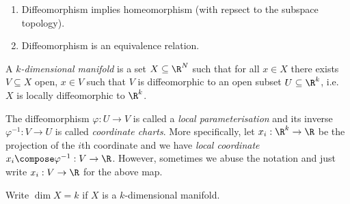 \documentclass[a4paper]{article}
\begin{document}
\begin{remark}\leavevmode
  \begin{enumerate}
  \item Diffeomorphism implies homeomorphism (with repsect to the subspace topology).
  \item Diffeomorphism is an equivalence relation.
  \end{enumerate}
\end{remark}

\begin{definition}[Manifold]
  A \emph{\(k\)-dimensional manifold} is a set \(X \subseteq \R^N\) such that for all \(x \in X\) there exists \(V \subseteq X\) open, \(x \in V\) such that \(V\) is diffeomorphic to an open subset \(U \subseteq \R^k\), i.e.\ \(X\) is locally diffeomorphic to \(\R^k\).
\end{definition}

\begin{remark}
  The diffeomorphism \(\varphi: U \to V\) is called a \emph{local parameterisation} and its inverse \(\varphi^{-1}: V \to U\) is called \emph{coordinate charts}. More specifically, let \(x_i: \R^k \to \R\) be the projection of the \(i\)th coordinate and we have \emph{local coordinate} \(x_i \compose \varphi^{-1}: V \to \R\). However, sometimes we abuse the notation and just write \(x_i: V \to \R\) for the above map.
\end{remark}

\begin{notation}
  Write \(\dim X = k\) if \(X\) is a \(k\)-dimensional manifold.
\end{notation}
\end{document}
